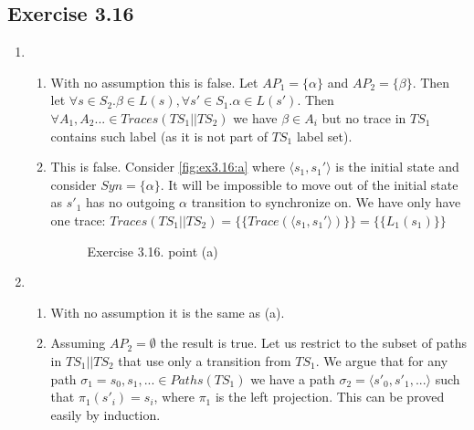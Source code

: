 \documentclass{article}
\begin{document}
	\subsection*{Exercise 3.16}
	\begin{enumerate}[label=(\alph*)]
		\item 
		\begin{enumerate}[label=\arabic*.]
			\item With no assumption this is false. Let $AP_1 = \{\alpha\}$ and $AP_2=\{\beta\}$. Then let $\forall s \in S_2. \beta \in L(s), \forall s' \in S_1. \alpha \in L(s')$. Then $\forall A_1,A_2... \in Traces(TS_1 || TS_2)$ we have $\beta \in A_i$ but no trace in $TS_1$ contains such label (as it is not part of $TS_1$ label set).
			\item This is false. Consider \autoref{fig:ex3.16:a} where $\langle s_1, s_1'\rangle$ is the initial state and consider $Syn=\{\alpha\}$. It will be impossible to move out of the initial state as $s'_1$ has no outgoing $\alpha$ transition to synchronize on. We have only have one trace: $Traces(TS_1 || TS_2)=\{\{Trace(\langle s_1, s_1'\rangle)\}\}=\{\{L_1(s_1)\}\}$
			\begin{figure}[ht]
				\centering    
				\caption{Exercise 3.16. point (a)}
				\label{fig:ex3.16:a}
			\end{figure}
		\end{enumerate}
		\item
		\begin{enumerate}[label=\arabic*.]
			\item With no assumption it is the same as (a).
			\item Assuming $AP_2 = \emptyset$ the result is true. Let us restrict to the subset of paths in $TS_1 || TS_2$ that use only a transition from $TS_1$. We argue that for any path $\sigma_1 = s_0,s_1,... \in Paths(TS_1)$ we have a path $\sigma_2 = \langle s'_0,s'_1,...\rangle$ such that $\pi_1(s'_i)=s_i$, where $\pi_1$ is the left projection. This can be proved easily by induction.
		\end{enumerate}

\end{enumerate}
\end{document}
